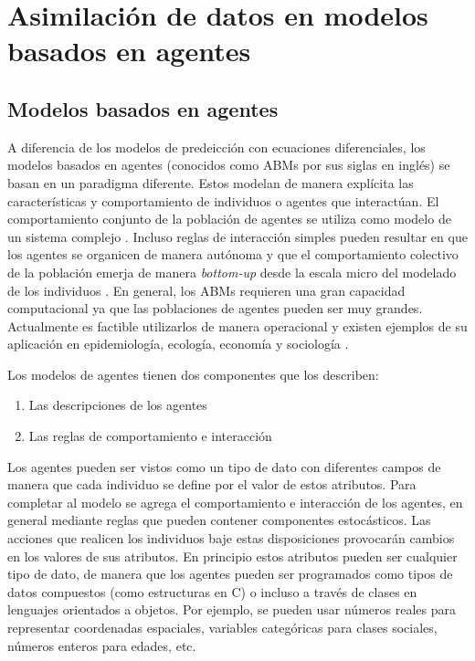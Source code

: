\chapter{Asimilación de datos en modelos basados en agentes} \label{chp:da_abms}

\section{Modelos basados en agentes}

A diferencia de los modelos de predeicción con ecuaciones diferenciales, los modelos basados en agentes (conocidos como ABMs por sus siglas en inglés) se basan en un paradigma diferente. Estos modelan de manera explícita las características y comportamiento de individuos o agentes que interactúan. El comportamiento conjunto de la población de agentes se utiliza como modelo de un sistema complejo \citep{Bonabeau2002}. Incluso reglas de interacción simples pueden resultar en que los agentes se organicen de manera autónoma y que el comportamiento colectivo de la población emerja de manera \textit{bottom-up} desde la escala micro del modelado de los individuos \citep{Helbing2012}. En general, los ABMs requieren una gran capacidad computacional ya que las poblaciones de agentes pueden ser muy grandes. Actualmente es factible utilizarlos de manera operacional y existen ejemplos de su aplicación en epidemiología, ecología, economía y sociología \citep{Vynnycky2010, Grimm2005, Tesfatsion2006, Epstein1996}.

Los modelos de agentes tienen dos componentes que los describen: 
\begin{enumerate}
    \item Las descripciones de los agentes
    \item Las reglas de comportamiento e interacción
\end{enumerate}
Los agentes pueden ser vistos como un tipo de dato con diferentes campos de manera que cada individuo se define por el valor de estos atributos. Para completar al modelo se agrega el comportamiento e interacción de los agentes, en general mediante reglas que pueden contener componentes estocásticos. Las acciones que realicen los individuos baje estas disposiciones provocarán cambios en los valores de sus atributos. En principio estos atributos pueden ser cualquier tipo de dato, de manera que los agentes pueden ser programados como tipos de datos compuestos (como estructuras en C) o incluso a través de clases en lenguajes orientados a objetos. Por ejemplo, se pueden usar números reales para representar coordenadas espaciales, variables categóricas para clases sociales, números enteros para edades, etc.

